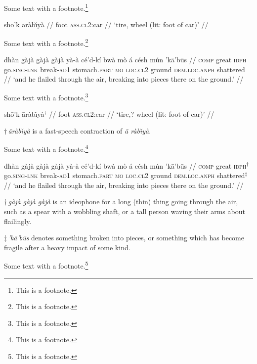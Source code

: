 \documentclass{article}
\begin{document}
Some text with a footnote.\footnote{This is a footnote.}

\ex
{}
\begingl
\gla sh\=o'k {\=ar\`ab{\v\i}y\`a\glfnA\/} //
\glb foot \textsc{ass.cl2}:car //
\glft `tire, wheel (lit: foot of car)' // \endgl
\xe
{}

Some text with a footnote.\footnote{This is a footnote.}

\ex
{}
\begingl
{} dh\`an {g\`aj\`a g\`aj\`a g\`aj\`a} y\`a-\`a c\'e'd-k{\'i} bw\`a
m\`o \'a c\'esh m\'un 'k\=a'b\=us //
\glb \textsc{comp} great {\textsc{idph}\glfnA} go.\textsc{sing}-\textsc{lnk}
break-\textsc{ad1} stomach.\textsc{part} \textsc{mo} \textsc{loc.cl2} ground
\textsc{dem.loc.anph} {shattered\glfnB} //
\glft `and he flailed through the air, breaking into pieces there on the
ground.' //
\endgl
\xe
{}

Some text with a footnote.\footnote{This is a footnote.}

\ex
\begingl
\gla sh\=o'k \=ar\`ab{\v\i}y\`a$^{\dag}$ //
\glb foot \textsc{ass.cl2}:car //
\glft `tire,? wheel (lit: foot of car)' //
\endgl

\medskip
$\dag\,${\sl \=ar\`ab{\v\i}y\`a\/} is a fast-speech contraction of
{\sl \=a r\`ab{\v\i}y\`a}.
\xe

Some text with a footnote.\footnote{This is a footnote.}

\ex
\begingl
{} dh\`an {g\`aj\`a g\`aj\`a g\`aj\`a} y\`a-\`a c\'e'd-k{\'i} bw\`a
m\`o \'a c\'esh m\'un 'k\=a'b\=us //
\glb \textsc{comp} great \textsc{idph}$^{\dag}$ go.\textsc{sing}-\textsc{lnk}
break-\textsc{ad1} stomach.\textsc{part} \textsc{mo} \textsc{loc.cl2} ground
\textsc{dem.loc.anph} shattered$^{\ddag}$ //
\glft `and he flailed through the air, breaking into pieces there on the
ground.' //
\endgl

\medskip
$\dag\,${\sl g\`aj\`a g\`aj\`a g\`aj\`a\/} is an ideophone for a long (thin)
thing going through the air, such as a spear with a wobbling shaft, or a tall
person waving their arms about flailingly.

$\ddag\,${\sl 'k\=a'b\=us\/} denotes something broken into pieces, or something
which has become fragile after a heavy impact of some kind.
\xe

Some text with a footnote.\footnote{This is a footnote.}
\end{document}
